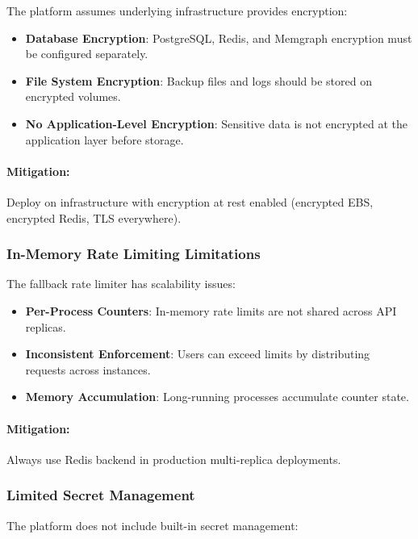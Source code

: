 The platform assumes underlying infrastructure provides encryption:

\begin{itemize}
    \item \textbf{Database Encryption}: PostgreSQL, Redis, and Memgraph encryption must be configured separately.
    \item \textbf{File System Encryption}: Backup files and logs should be stored on encrypted volumes.
    \item \textbf{No Application-Level Encryption}: Sensitive data is not encrypted at the application layer before storage.
\end{itemize}

\paragraph{Mitigation:} Deploy on infrastructure with encryption at rest enabled (encrypted EBS, encrypted Redis, TLS everywhere).

\subsubsection{In-Memory Rate Limiting Limitations}

The fallback rate limiter has scalability issues:

\begin{itemize}
    \item \textbf{Per-Process Counters}: In-memory rate limits are not shared across API replicas.
    \item \textbf{Inconsistent Enforcement}: Users can exceed limits by distributing requests across instances.
    \item \textbf{Memory Accumulation}: Long-running processes accumulate counter state.
\end{itemize}

\paragraph{Mitigation:} Always use Redis backend in production multi-replica deployments.

\subsubsection{Limited Secret Management}

The platform does not include built-in secret management:

